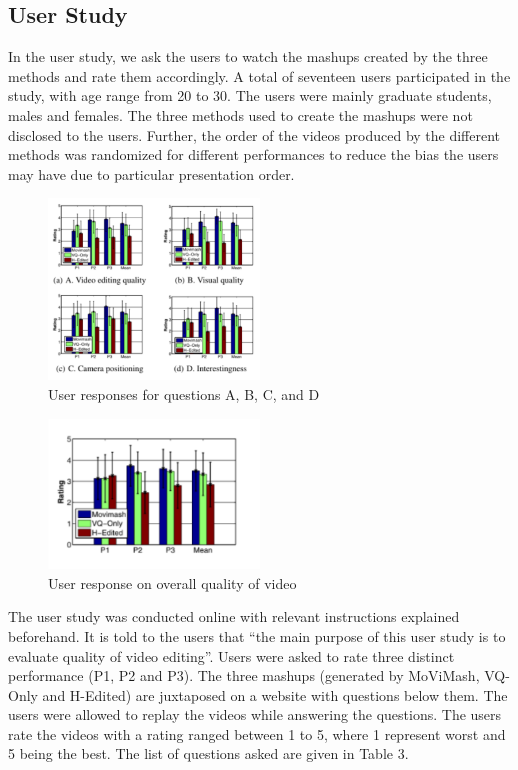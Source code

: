 \documentclass{new}
\begin{document}
\subsection{User Study}
In the user study, we ask the users to watch the mashups created
by the three methods and rate them accordingly. A total of seventeen
users participated in the study, with age range from 20 to 30.
The users were mainly graduate students, males and females. The
three methods used to create the mashups were not disclosed to the
users. Further, the order of the videos produced by the different
methods was randomized for different performances to reduce the
bias the users may have due to particular presentation order.
\begin{figure}[h]
\includegraphics[width=0.5\textwidth]{img7}
\caption{ User responses for questions A, B, C, and D}
\end{figure}

\begin{figure}[h]
\includegraphics[width=0.5\textwidth]{img8}
\caption{ User response on overall quality of video}
\end{figure}
The user study was conducted online with relevant instructions
explained beforehand. It is told to the users that ``the main purpose
of this user study is to evaluate quality of video editing''. Users
were asked to rate three distinct performance (P1, P2 and P3). The
three mashups (generated by MoViMash, VQ-Only and H-Edited)
are juxtaposed on a website with questions below them. The users were allowed to replay the videos while answering the questions.
The users rate the videos with a rating ranged between 1 to 5, where
1 represent worst and 5 being the best. The list of questions asked
are given in  Table 3.
\end{document}
